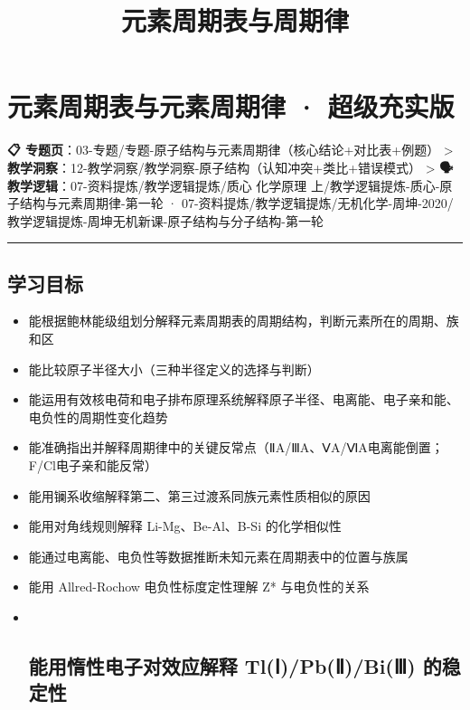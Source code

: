 \documentclass[a4paper,11pt]{ctexart}
\title{元素周期表与周期律}
\date{}
\begin{document}
\maketitle
\tableofcontents
\newpage
\section{元素周期表与元素周期律 · 超级充实版}\label{ux5143ux7d20ux5468ux671fux8868ux4e0eux5143ux7d20ux5468ux671fux5f8b-ux8d85ux7ea7ux5145ux5b9eux7248}

\textbf{📋 专题页}：03-专题/专题-原子结构与元素周期律（核心结论+对比表+例题）
\textgreater{} \textbf{🧠 教学洞察}：12-教学洞察/教学洞察-原子结构（认知冲突+类比+错误模式）
\textgreater{} \textbf{🗣️ 教学逻辑}：07-资料提炼/教学逻辑提炼/质心 化学原理 上/教学逻辑提炼-质心-原子结构与元素周期律-第一轮 · 07-资料提炼/教学逻辑提炼/无机化学-周坤-2020/教学逻辑提炼-周坤无机新课-原子结构与分子结构-第一轮

\begin{center}\rule{0.5\linewidth}{0.5pt}\end{center}

\subsection{学习目标}\label{ux5b66ux4e60ux76eeux6807}

\begin{itemize}
\item
  能根据鲍林能级组划分解释元素周期表的周期结构，判断元素所在的周期、族和区
\item
  能比较原子半径大小（三种半径定义的选择与判断）
\item
  能运用有效核电荷和电子排布原理系统解释原子半径、电离能、电子亲和能、电负性的周期性变化趋势
\item
  能准确指出并解释周期律中的关键反常点（ⅡA/ⅢA、ⅤA/ⅥA电离能倒置；F/Cl电子亲和能反常）
\item
  能用镧系收缩解释第二、第三过渡系同族元素性质相似的原因
\item
  能用对角线规则解释 Li-Mg、Be-Al、B-Si 的化学相似性
\item
  能通过电离能、电负性等数据推断未知元素在周期表中的位置与族属
\item
  能用 Allred-Rochow 电负性标度定性理解 Z* 与电负性的关系
\item ~
  \subsection{能用惰性电子对效应解释 Tl(Ⅰ)/Pb(Ⅱ)/Bi(Ⅲ) 的稳定性}\label{ux80fdux7528ux60f0ux6027ux7535ux5b50ux5bf9ux6548ux5e94ux89e3ux91ca-tlux2170pbux2171biux2172-ux7684ux7a33ux5b9aux6027}
\end{itemize}
\end{document}

